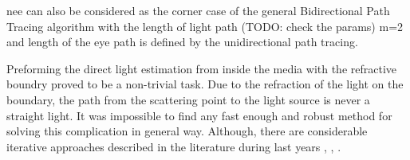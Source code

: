 \gls{nee} can also be considered as the corner case of the general
Bidirectional Path Tracing algorithm \cite{Veach:94:BDPT} with the length of light
path (TODO: check the params) m=2 and length of the eye path is defined by the
unidirectional path tracing.

Preforming the direct light estimation from inside the media with the refractive
boundry proved to be a non-trivial task. Due to the refraction of the
light on the boundary, the path from the scattering point to the light source is
never a straight light. It was impossible to find any fast enough and
robust method for solving this complication in general way. Although, there
are considerable iterative approaches described in the literature  during last
years \cite{holzschuch:hal-01083246}, \cite{10.1111:cgf.12681}, \cite{Koerner2016}.


